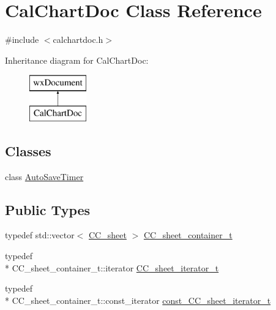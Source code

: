 \hypertarget{a00020}{\section{Cal\-Chart\-Doc Class Reference}
\label{a00020}
}


{\ttfamily \#include $<$calchartdoc.\-h$>$}

Inheritance diagram for Cal\-Chart\-Doc\-:\begin{figure}[H]
\begin{center}
\leavevmode
\includegraphics[height=2.000000cm]{a00020}
\end{center}
\end{figure}
\subsection*{Classes}
\begin{DoxyCompactItemize}
\item 
class \hyperlink{a00016}{Auto\-Save\-Timer}
\end{DoxyCompactItemize}
\subsection*{Public Types}
\begin{DoxyCompactItemize}
\item 
typedef std\-::vector$<$ \hyperlink{a00045}{C\-C\-\_\-sheet} $>$ \hyperlink{a00020_ab378b0e2a08984cfda6487b5161e520c}{C\-C\-\_\-sheet\-\_\-container\-\_\-t}
\item 
typedef \\*
C\-C\-\_\-sheet\-\_\-container\-\_\-t\-::iterator \hyperlink{a00020_a36548f14d6c85b0abee6f2956dbe4689}{C\-C\-\_\-sheet\-\_\-iterator\-\_\-t}
\item 
typedef \\*
C\-C\-\_\-sheet\-\_\-container\-\_\-t\-::const\-\_\-iterator \hyperlink{a00020_a40ea5298b58fb5f3b5f648e6ef36a286}{const\-\_\-\-C\-C\-\_\-sheet\-\_\-iterator\-\_\-t}
\end{DoxyCompactItemize}
